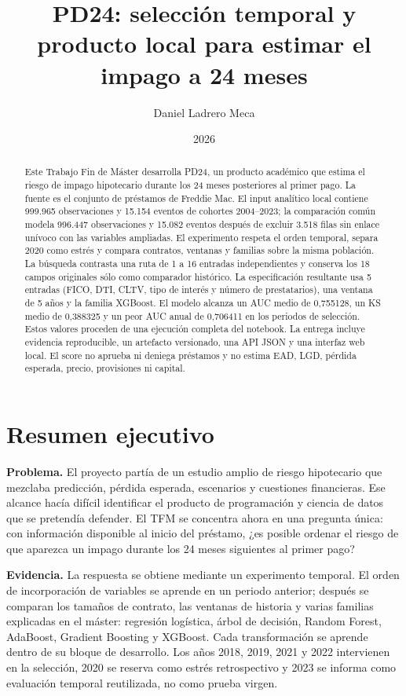 \documentclass[10pt,a4paper]{article}
\title{PD24: selección temporal y producto local para estimar el impago a 24 meses}
\author{Daniel Ladrero Meca}
\date{2026}
\newcommand{\SourceLoans}{999.965}
\newcommand{\SourceEvents}{15.154}
\newcommand{\ModelLoans}{996.447}
\newcommand{\ModelEvents}{15.082}
\newcommand{\SelectedFamily}{XGBoost}
\newcommand{\SelectedK}{5}
\newcommand{\SelectedWindow}{5}
\newcommand{\SelectedFeatures}{FICO, DTI, CLTV, tipo de interés y número de prestatarios}
\newcommand{\MeanAUC}{0,755128}
\newcommand{\MeanKS}{0,388325}
\newcommand{\WorstAUC}{0,706411}
\begin{document}
\maketitle

\begin{abstract}
Este Trabajo Fin de Máster desarrolla PD24, un producto académico que estima el
riesgo de impago hipotecario durante los 24 meses posteriores al primer pago.
La fuente es el conjunto de préstamos de Freddie Mac. El input analítico local
contiene \SourceLoans{} observaciones y \SourceEvents{} eventos de cohortes
2004--2023; la comparación común modela \ModelLoans{} observaciones y
\ModelEvents{} eventos después de excluir 3.518 filas sin enlace unívoco con
las variables ampliadas. El experimento respeta el orden temporal, separa 2020
como estrés y compara contratos, ventanas y familias sobre la misma población.
La búsqueda contrasta una ruta de 1 a 16 entradas independientes y conserva los
18 campos originales sólo como comparador histórico. La especificación
resultante usa \SelectedK{} entradas (\SelectedFeatures), una ventana de
\SelectedWindow{} años y la familia \SelectedFamily{}. El modelo alcanza un AUC medio de \MeanAUC{}, un KS
medio de \MeanKS{} y un peor AUC anual de \WorstAUC{} en los periodos de
selección. Estos valores proceden de una ejecución completa del notebook. La entrega incluye evidencia reproducible,
un artefacto versionado, una API JSON y una interfaz web local. El score no
aprueba ni deniega préstamos y no estima EAD, LGD, pérdida esperada, precio,
provisiones ni capital.
\end{abstract}

\setcounter{tocdepth}{1}
\tableofcontents

\clearpage
\section{Resumen ejecutivo}

\textbf{Problema.} El proyecto partía de un estudio amplio de riesgo hipotecario
que mezclaba predicción, pérdida esperada, escenarios y cuestiones financieras.
Ese alcance hacía difícil identificar el producto de programación y ciencia de
datos que se pretendía defender. El TFM se concentra ahora en una pregunta única:
con información disponible al inicio del préstamo, ¿es posible ordenar el riesgo
de que aparezca un impago durante los 24 meses siguientes al primer pago?

\textbf{Evidencia.} La respuesta se obtiene mediante un experimento temporal. El
orden de incorporación de variables se aprende en un periodo anterior; después
se comparan los tamaños de contrato, las ventanas de historia y varias familias
explicadas en el máster: regresión logística, árbol de decisión, Random Forest,
AdaBoost, Gradient Boosting y XGBoost. Cada transformación se aprende dentro de
su bloque de desarrollo. Los años 2018, 2019, 2021 y 2022 intervienen en la selección,
2020 se reserva como estrés retrospectivo y 2023 se informa como evaluación
temporal reutilizada, no como prueba virgen.
\end{document}
